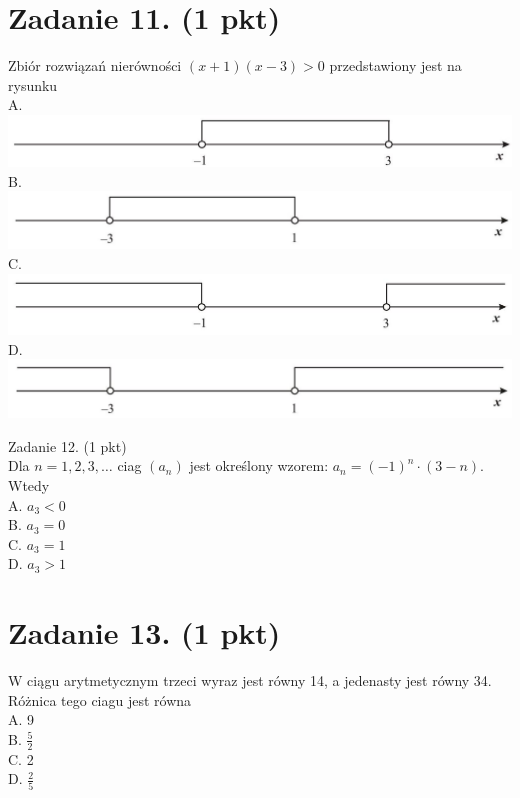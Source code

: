 \documentclass[10pt]{article}
\begin{document}
\section*{Zadanie 11. (1 pkt)}
Zbiór rozwiązań nierówności \((x+1)(x-3)>0\) przedstawiony jest na rysunku\\
A.\\
\includegraphics[max width=\textwidth, center]{2024_11_21_ad52a81220b9b2239458g-04(1)}\\
B.\\
\includegraphics[max width=\textwidth, center]{2024_11_21_ad52a81220b9b2239458g-04(2)}\\
C.\\
\includegraphics[max width=\textwidth, center]{2024_11_21_ad52a81220b9b2239458g-04}\\
D.\\
\includegraphics[max width=\textwidth, center]{2024_11_21_ad52a81220b9b2239458g-04(3)}

Zadanie 12. (1 pkt)\\
Dla \(n=1,2,3, \ldots\) ciag \(\left(a_{n}\right)\) jest określony wzorem: \(a_{n}=(-1)^{n} \cdot(3-n)\). Wtedy\\
A. \(a_{3}<0\)\\
B. \(a_{3}=0\)\\
C. \(a_{3}=1\)\\
D. \(a_{3}>1\)

\section*{Zadanie 13. (1 pkt)}
W ciągu arytmetycznym trzeci wyraz jest równy 14, a jedenasty jest równy 34. Różnica tego ciagu jest równa\\
A. 9\\
B. \(\frac{5}{2}\)\\
C. 2\\
D. \(\frac{2}{5}\)
\end{document}
